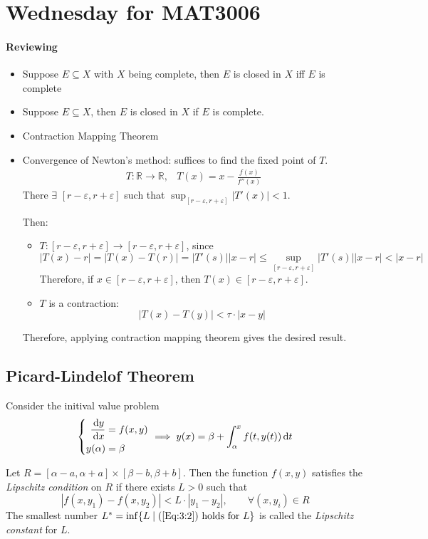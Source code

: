 \section{Wednesday for MAT3006}
\paragraph{Reviewing}
\begin{itemize}
\item
Suppose $E\subseteq X$ with $X$ being complete, then
$E$ is closed in $X$ iff $E$ is complete
\item
Suppose $E\subseteq X$, then
$E$ is closed in $X$ if $E$ is complete.
\item
Contraction Mapping Theorem
\item
Convergence of Newton's method: suffices to find the fixed point of $T$.
\[
\begin{array}{ll}
T:\mathbb{R}\to\mathbb{R},
&
T(x)=x-\frac{f(x)}{f''(x)}
\end{array}
\]
There $\exists$ $[r-\varepsilon,r+\varepsilon]$ such that $\sup_{[r-\varepsilon,r+\varepsilon]}|T'(x)|<1$.

Then:
\begin{itemize}
\item
$T: [r-\varepsilon,r+\varepsilon]\to[r-\varepsilon,r+\varepsilon]$, since
\[
|T(x)-r|=|T(x)-T(r)|=|T'(s)||x-r|\le\sup_{[r-\varepsilon,r+\varepsilon]}|T'(s)||x-r|<|x-r|
\]
Therefore, if $x\in [r-\varepsilon,r+\varepsilon]$, then $T(x)\in [r-\varepsilon,r+\varepsilon]$.
\item
$T$ is a contraction:
\[
|T(x)-T(y)|<\tau\cdot|x-y|
\]
\end{itemize}
Therefore, applying contraction mapping theorem gives the desired result.
\end{itemize}

\subsection{Picard-Lindelof Theorem}
Consider the initival value problem
\begin{equation}\label{Eq:3:3}
\left\{
\begin{aligned}
\frac{\diff y}{\diff x}&=f(x,y)\\
y(\alpha)&=\beta
\end{aligned}
\right.
\implies
y(x)=\beta+\int_{\alpha}^xf(t,y(t))\diff t
\end{equation}


\begin{definition}
Let $R=[\alpha-a,\alpha+a]\times[\beta-b,\beta+b]$. Then the function $f(x,y)$ satisfies the \emph{Lipschitz condition} on $R$ if there exists $L>0$ such that
\begin{equation}\label{Eq:3:2}
|f(x,y_1)-f(x,y_2)|<L\cdot |y_1-y_2|,\qquad
\forall (x,y_i)\in R
\end{equation}
The smallest number $L^*=\inf\{L\mid (\ref{Eq:3:2})\text{ holds for $L$}\}$ is called the \emph{Lipschitz constant} for $L$.
\end{definition}

